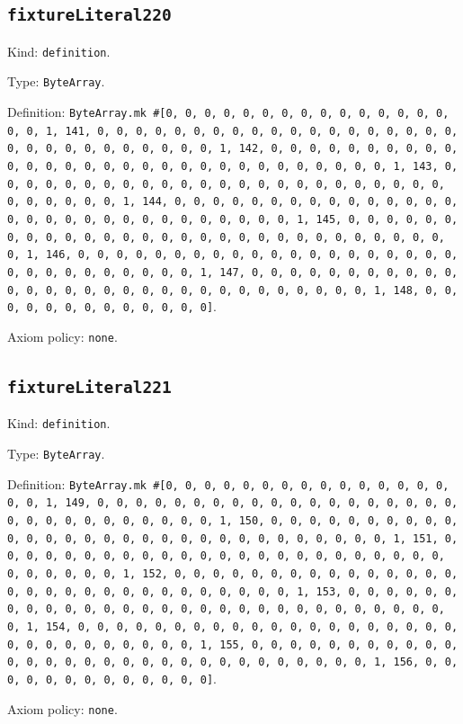 \documentclass[11pt]{article}
\begin{document}
\subsection*{\texttt{fixtureLiteral220}}
\noindent Kind: \texttt{definition}.\par
\noindent Type: \texttt{ByteArray}.\par
\noindent Definition: \texttt{ByteArray.mk \#[0, 0, 0, 0, 0, 0, 0, 0, 0, 0, 0, 0, 0, 0, 0, 0, 0, 1, 141, 0, 0, 0, 0, 0, 0, 0, 0, 0, 0, 0, 0, 0, 0, 0, 0, 0, 0, 0, 0, 0, 0, 0, 0, 0, 0, 0, 0, 0, 0, 1, 142, 0, 0, 0, 0, 0, 0, 0, 0, 0, 0, 0, 0, 0, 0, 0, 0, 0, 0, 0, 0, 0, 0, 0, 0, 0, 0, 0, 0, 0, 0, 1, 143, 0, 0, 0, 0, 0, 0, 0, 0, 0, 0, 0, 0, 0, 0, 0, 0, 0, 0, 0, 0, 0, 0, 0, 0, 0, 0, 0, 0, 0, 0, 1, 144, 0, 0, 0, 0, 0, 0, 0, 0, 0, 0, 0, 0, 0, 0, 0, 0, 0, 0, 0, 0, 0, 0, 0, 0, 0, 0, 0, 0, 0, 0, 1, 145, 0, 0, 0, 0, 0, 0, 0, 0, 0, 0, 0, 0, 0, 0, 0, 0, 0, 0, 0, 0, 0, 0, 0, 0, 0, 0, 0, 0, 0, 0, 1, 146, 0, 0, 0, 0, 0, 0, 0, 0, 0, 0, 0, 0, 0, 0, 0, 0, 0, 0, 0, 0, 0, 0, 0, 0, 0, 0, 0, 0, 0, 0, 1, 147, 0, 0, 0, 0, 0, 0, 0, 0, 0, 0, 0, 0, 0, 0, 0, 0, 0, 0, 0, 0, 0, 0, 0, 0, 0, 0, 0, 0, 0, 0, 1, 148, 0, 0, 0, 0, 0, 0, 0, 0, 0, 0, 0, 0, 0]}.\par
\noindent Axiom policy: \texttt{none}.\par
\subsection*{\texttt{fixtureLiteral221}}
\noindent Kind: \texttt{definition}.\par
\noindent Type: \texttt{ByteArray}.\par
\noindent Definition: \texttt{ByteArray.mk \#[0, 0, 0, 0, 0, 0, 0, 0, 0, 0, 0, 0, 0, 0, 0, 0, 0, 1, 149, 0, 0, 0, 0, 0, 0, 0, 0, 0, 0, 0, 0, 0, 0, 0, 0, 0, 0, 0, 0, 0, 0, 0, 0, 0, 0, 0, 0, 0, 0, 1, 150, 0, 0, 0, 0, 0, 0, 0, 0, 0, 0, 0, 0, 0, 0, 0, 0, 0, 0, 0, 0, 0, 0, 0, 0, 0, 0, 0, 0, 0, 0, 1, 151, 0, 0, 0, 0, 0, 0, 0, 0, 0, 0, 0, 0, 0, 0, 0, 0, 0, 0, 0, 0, 0, 0, 0, 0, 0, 0, 0, 0, 0, 0, 1, 152, 0, 0, 0, 0, 0, 0, 0, 0, 0, 0, 0, 0, 0, 0, 0, 0, 0, 0, 0, 0, 0, 0, 0, 0, 0, 0, 0, 0, 0, 0, 1, 153, 0, 0, 0, 0, 0, 0, 0, 0, 0, 0, 0, 0, 0, 0, 0, 0, 0, 0, 0, 0, 0, 0, 0, 0, 0, 0, 0, 0, 0, 0, 1, 154, 0, 0, 0, 0, 0, 0, 0, 0, 0, 0, 0, 0, 0, 0, 0, 0, 0, 0, 0, 0, 0, 0, 0, 0, 0, 0, 0, 0, 0, 0, 1, 155, 0, 0, 0, 0, 0, 0, 0, 0, 0, 0, 0, 0, 0, 0, 0, 0, 0, 0, 0, 0, 0, 0, 0, 0, 0, 0, 0, 0, 0, 0, 1, 156, 0, 0, 0, 0, 0, 0, 0, 0, 0, 0, 0, 0, 0]}.\par
\noindent Axiom policy: \texttt{none}.\par
\end{document}
